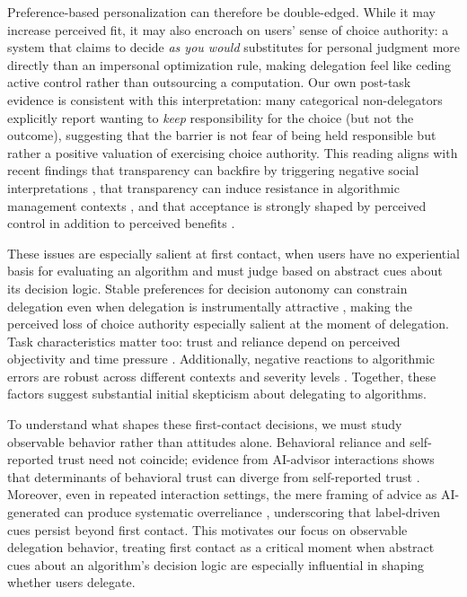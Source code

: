 \documentclass[a4paper, 12pt, fleqn]{article}
\theoremstyle{definition}
\begin{document}
Preference-based personalization can therefore be double-edged. While it may increase perceived fit, it may also encroach on users' sense of choice authority: a system that claims to decide \emph{as you would} substitutes for personal judgment more directly than an impersonal optimization rule, making delegation feel like ceding active control rather than outsourcing a computation. Our own post-task evidence is consistent with this interpretation: many categorical non-delegators explicitly report wanting to \emph{keep} responsibility for the choice (but not the outcome), suggesting that the barrier is not fear of being held responsible but rather a positive valuation of exercising choice authority. This reading aligns with recent findings that transparency can backfire by triggering negative social interpretations \citep{Chen2024}, that transparency can induce resistance in algorithmic management contexts \citep{Hu2024}, and that acceptance is strongly shaped by perceived control in addition to perceived benefits \citep{Schaap2024}.

These issues are especially salient at first contact, when users have no experiential basis for evaluating an algorithm and must judge based on abstract cues about its decision logic. Stable preferences for decision autonomy can constrain delegation even when delegation is instrumentally attractive \citep{Ivanova-Stenzel2025}, making the perceived loss of choice authority especially salient at the moment of delegation. Task characteristics matter too: trust and reliance depend on perceived objectivity and time pressure \citep{Yang2025}. Additionally, negative reactions to algorithmic errors are robust across different contexts and severity levels \citep{Renier2021}. Together, these factors suggest substantial initial skepticism about delegating to algorithms.

To understand what shapes these first-contact decisions, we must study observable behavior rather than attitudes alone. Behavioral reliance and self-reported trust need not coincide; evidence from AI-advisor interactions shows that determinants of behavioral trust can diverge from self-reported trust \citep{Schreibelmayr2025}. Moreover, even in repeated interaction settings, the mere framing of advice as AI-generated can produce systematic overreliance \citep{Klingbeil2024}, underscoring that label-driven cues persist beyond first contact. This motivates our focus on observable delegation behavior, treating first contact as a critical moment when abstract cues about an algorithm's decision logic are especially influential in shaping whether users delegate.
\end{document}
